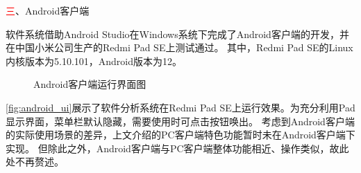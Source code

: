 
\textcolor{red}{三}、Android客户端

软件系统借助Android Studio在Windows系统下完成了Android客户端的开发，并在中国小米公司生产的Redmi Pad SE上测试通过。
其中，Redmi Pad SE的Linux内核版本为5.10.101，Android版本为12。
\begin{figure}[htbp]
    \centering
    \quad
    \caption{\label{fig:android_ui}Android客户端运行界面图}
\end{figure}


\autoref{fig:android_ui}展示了软件分析系统在Redmi Pad SE上运行效果。为充分利用Pad显示界面，菜单栏默认隐藏，需要使用时可点击按钮唤出。
考虑到Android客户端的实际使用场景的差异，上文介绍的PC客户端特色功能暂时未在Android客户端下实现。
但除此之外，Android客户端与PC客户端整体功能相近、操作类似，故此处不再赘述。




